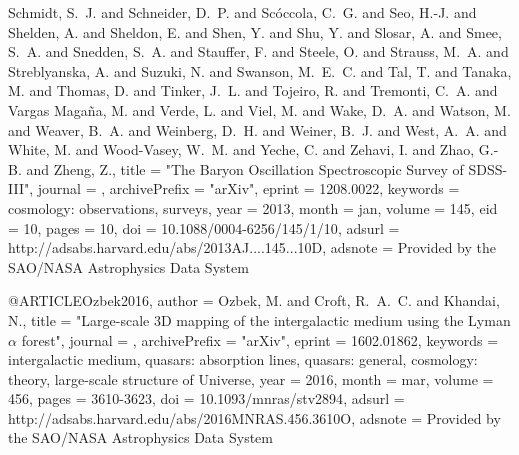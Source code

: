 \documentclass{aa}
\begin{document}
{{{{{{{{{{{{{{	{Schmidt}, S.~J. and {Schneider}, D.~P. and {Sc{\'o}ccola}, C.~G. and 
	{Seo}, H.-J. and {Shelden}, A. and {Sheldon}, E. and {Shen}, Y. and 
	{Shu}, Y. and {Slosar}, A. and {Smee}, S.~A. and {Snedden}, S.~A. and 
	{Stauffer}, F. and {Steele}, O. and {Strauss}, M.~A. and {Streblyanska}, A. and 
	{Suzuki}, N. and {Swanson}, M.~E.~C. and {Tal}, T. and {Tanaka}, M. and 
	{Thomas}, D. and {Tinker}, J.~L. and {Tojeiro}, R. and {Tremonti}, C.~A. and 
	{Vargas Maga{\~n}a}, M. and {Verde}, L. and {Viel}, M. and {Wake}, D.~A. and 
	{Watson}, M. and {Weaver}, B.~A. and {Weinberg}, D.~H. and {Weiner}, B.~J. and 
	{West}, A.~A. and {White}, M. and {Wood-Vasey}, W.~M. and {Yeche}, C. and 
	{Zehavi}, I. and {Zhao}, G.-B. and {Zheng}, Z.},
    title = "{The Baryon Oscillation Spectroscopic Survey of SDSS-III}",
  journal = {\aj},
archivePrefix = "arXiv",
   eprint = {1208.0022},
 keywords = {cosmology: observations, surveys},
     year = 2013,
    month = jan,
   volume = 145,
      eid = {10},
    pages = {10},
      doi = {10.1088/0004-6256/145/1/10},
   adsurl = {http://adsabs.harvard.edu/abs/2013AJ....145...10D},
  adsnote = {Provided by the SAO/NASA Astrophysics Data System}
}

@ARTICLE{Ozbek2016,
   author = {{Ozbek}, M. and {Croft}, R.~A.~C. and {Khandai}, N.},
    title = "{Large-scale 3D mapping of the intergalactic medium using the Lyman {$\alpha$} forest}",
  journal = {\mnras},
archivePrefix = "arXiv",
   eprint = {1602.01862},
 keywords = {intergalactic medium, quasars: absorption lines, quasars: general, cosmology: theory, large-scale structure of Universe},
     year = 2016,
    month = mar,
   volume = 456,
    pages = {3610-3623},
      doi = {10.1093/mnras/stv2894},
   adsurl = {http://adsabs.harvard.edu/abs/2016MNRAS.456.3610O},
  adsnote = {Provided by the SAO/NASA Astrophysics Data System}
}

}}}}}}}}}}}}
\end{document}
